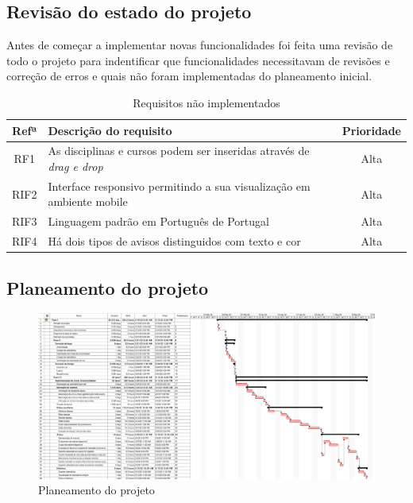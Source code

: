 \documentclass[12pt, twoside]{report}
\begin{document}
	\subsection{Revisão do estado do projeto}
	
		Antes de começar a implementar novas funcionalidades foi feita uma revisão de todo o projeto para indentificar que funcionalidades necessitavam de revisões e correção de erros e quais não foram implementadas do planeamento inicial.
		
			\begin{table}[H]
			\caption{Requisitos não implementados}
			
			\begin{center}
				\begin{tabularx}{\textwidth}{|c|X|c|}
					\hline
					\textbf{Refª }	& \textbf{Descrição do requisito} & \textbf{Prioridade} \\
					\hline
					RF1 & As disciplinas e cursos podem ser inseridas através de \textit{drag e drop} &Alta\\
					\hline
					RIF2 & Interface responsivo permitindo a sua visualização em ambiente mobile &Alta\\
					\hline
					RIF3 & Linguagem padrão em Português de Portugal &Alta\\
					\hline
					RIF4 & Há dois tipos de avisos distinguidos com texto e cor &Alta\\
					\hline
				\end{tabularx}
				\label{requisitosdeinterface}
			\end{center}
		\end{table}
	
	\subsection{Planeamento do projeto}
	
	
		\clearpage
	\begin{landscape}
		\pagestyle{empty}
		
		\begin{figure}[H] 
			\centering 			\includegraphics[width=1.4\textwidth,height=1.4\textheight,keepaspectratio]{image/planeamentoInicial}
			\caption{Planeamento do projeto}
			
		\end{figure}
		
		
	\end{landscape}
\end{document}
